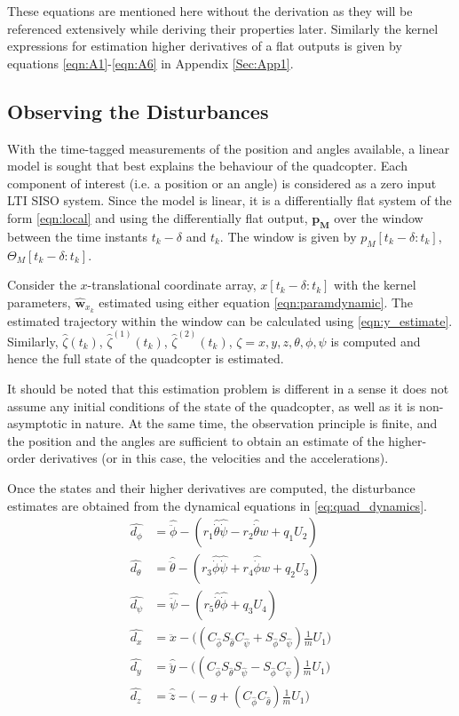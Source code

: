 \documentclass[letterpaper%
, twoside%
, 12pt%
,memoire%
, english%
,creativecommons,hyperref%
]{thETS}
\begin{document}
These equations are mentioned here without the derivation as they will be referenced extensively while deriving their properties later. Similarly the kernel  expressions for estimation higher derivatives of a flat outputs is given by equations \eqref{eqn:A1}-\eqref{eqn:A6} in Appendix \ref{Sec:App1}.


\subsection{Observing the Disturbances} \label{Sec:estimationtoobserver}
With the time-tagged measurements of the position and angles available, a linear model is sought that best explains the behaviour of the quadcopter. Each component of interest (i.e. a position or an angle) is considered as a zero input LTI SISO system. Since the model is linear, it is a differentially flat system of the form \eqref{eqn:local} and using the differentially flat output, $\mathbf{p_M}$ over the window between the time instants $t_k-\delta$ and $t_k$. The window is given by $p_M[t_k-\delta:t_k]$, $\Theta_M[t_k-\delta:t_k]$. 

Consider the $x$-translational coordinate array, $x[t_k-\delta:t_k]$ with the kernel parameters, $\hat{\mathbf{w}}_{x_k}$ estimated using either equation \eqref{eqn:paramdynamic}. The estimated trajectory within the window can be calculated using \eqref{eqn:y_estimate}. Similarly, $\hat{\zeta}(t_k)$, $\hat{\zeta}^{(1)}(t_k)$, $\hat{\zeta}^{(2)}(t_k)$, $\zeta=x,y,z,\theta,\phi,\psi$ is computed and hence the full state of the quadcopter is estimated.

It should be noted that this estimation problem is different in a sense it does not assume any initial conditions of the state of the quadcopter, as well as it is non-asymptotic in nature. At the same time, the observation principle is finite, and the position and the angles are sufficient to obtain an estimate of the higher-order derivatives (or in this case, the velocities and the accelerations).

Once the states and their higher derivatives are computed, the disturbance estimates are obtained from the dynamical equations in \eqref{eq:quad_dynamics}. 
\begin{equation}
	\label{eq:KDO}
    \begin{aligned}
    \hat{d_\phi}&=\hat{\ddot{\phi}}-(r_1\hat{\dot{\theta}}\hat{\dot{\psi}}-r_2\hat{\dot{\theta}}w+q_1U_2)\\
    \hat{d_\theta}&=\hat{\ddot{\theta}}-(r_3\hat{\dot{\phi}}\hat{\dot{\psi}}+r_4\hat{\dot{\phi}}w+q_2U_3)\\
    \hat{d_\psi}&=\hat{\ddot{\psi}}-(r_5\hat{\dot{\theta}}\hat{\dot{\phi}}+q_3U_4)\\
    \hat{d_x}&=\hat{\ddot{x}}-\Big((C_{\hat{\phi}}S_{\hat{\theta}}C_{\hat{\psi}}+S_{\hat{\phi}}S_{\hat{\psi}})\frac{1}{m}U_1\Big)\\
    \hat{d_y}&=\hat{\ddot{y}}-\Big((C_{\hat{\phi}}S_{\hat{\theta}}S_{\hat{\psi}}-S_{\hat{\phi}}C_{\hat{\psi}})\frac{1}{m}U_1\Big)\\
    \hat{d_z}&=\hat{\ddot{z}}-\Big(-g+(C_{\hat{\phi}}C_{\hat{\theta}})\frac{1}{m}U_1\Big)
    \end{aligned}
\end{equation}
\end{document}
